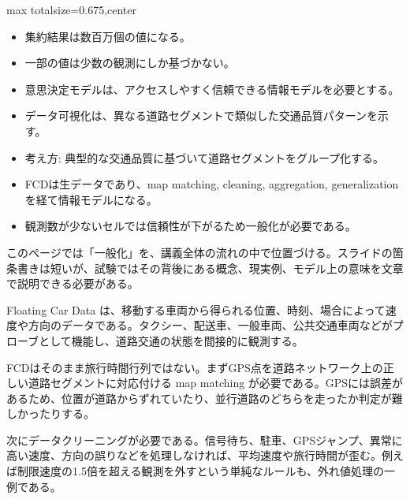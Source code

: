 \clearpage
{}
\begin{adjustbox}{max totalsize={\textwidth}{0.675\textheight},center}
\begin{minipage}{\textwidth}\scriptsize
\begin{minipage}[t]{0.485\textwidth}
\begin{itemize}
\item 集約結果は数百万個の値になる。
\item 一部の値は少数の観測にしか基づかない。
\item 意思決定モデルは、アクセスしやすく信頼できる情報モデルを必要とする。
\item データ可視化は、異なる道路セグメントで類似した交通品質パターンを示す。
\item 考え方: 典型的な交通品質に基づいて道路セグメントをグループ化する。
\end{itemize}
\begin{itemize}
\item FCDは生データであり、map matching, cleaning, aggregation, generalization を経て情報モデルになる。
\item 観測数が少ないセルでは信頼性が下がるため一般化が必要である。
\end{itemize}
\end{minipage}\hfill
\begin{minipage}[t]{0.485\textwidth}
このページでは「一般化」を、講義全体の流れの中で位置づける。スライドの箇条書きは短いが、試験ではその背後にある概念、現実例、モデル上の意味を文章で説明できる必要がある。\par
Floating Car Data は、移動する車両から得られる位置、時刻、場合によって速度や方向のデータである。タクシー、配送車、一般車両、公共交通車両などがプローブとして機能し、道路交通の状態を間接的に観測する。\par
FCDはそのまま旅行時間行列ではない。まずGPS点を道路ネットワーク上の正しい道路セグメントに対応付ける map matching が必要である。GPSには誤差があるため、位置が道路からずれていたり、並行道路のどちらを走ったか判定が難しかったりする。\par
次にデータクリーニングが必要である。信号待ち、駐車、GPSジャンプ、異常に高い速度、方向の誤りなどを処理しなければ、平均速度や旅行時間が歪む。例えば制限速度の1.5倍を超える観測を外すという単純なルールも、外れ値処理の一例である。\par

\end{minipage}
\end{minipage}
\end{adjustbox}
